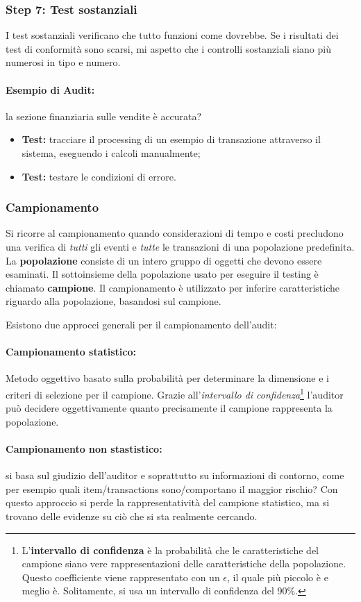 \subsubsection{Step 7: Test sostanziali}
I test sostanziali verificano che tutto funzioni come dovrebbe.
Se i risultati dei test di conformità sono scarsi, mi aspetto che i controlli
sostanziali siano più numerosi in tipo e numero.

\paragraph*{Esempio di Audit:} la sezione finanziaria sulle vendite è accurata?

\begin{itemize}
\item \textbf{Test:} tracciare il processing di un esempio di transazione
attraverso il sistema, eseguendo i calcoli manualmente;
\item \textbf{Test:} testare le condizioni di errore.
\end{itemize}


\subsubsection{Campionamento}
Si ricorre al campionamento quando considerazioni di tempo e costi
precludono una verifica di \emph{tutti} gli eventi e
\emph{tutte} le transazioni di una popolazione predefinita.
La \textbf{popolazione} consiste di un intero gruppo di oggetti
che devono essere esaminati.
Il sottoinsieme della popolazione usato per
eseguire il testing è chiamato \textbf{campione}. Il campionamento
è utilizzato per inferire caratteristiche riguardo alla popolazione,
basandosi sul campione.

Esistono due approcci generali per il campionamento dell'audit:
\paragraph*{Campionamento statistico:}
Metodo oggettivo basato sulla probabilità per determinare
la dimensione e i criteri di selezione per il campione.
Grazie all'\textit{intervallo
di confidenza}\footnote{L'\textbf{intervallo
di confidenza} è la probabilità che le caratteristiche del
campione siano vere rappresentazioni delle caratteristiche della
popolazione. Questo coefficiente viene rappresentato con un $\epsilon$,
il quale più piccolo è e meglio è. Solitamente, si usa un intervallo di
confidenza del 90\%.} l'auditor può decidere oggettivamente
quanto precisamente il campione rappresenta la popolazione.


\paragraph*{Campionamento non stastistico:} si basa sul giudizio
dell'auditor e soprattutto su informazioni di contorno, come per
esempio quali item/transactions sono/comportano il maggior rischio?
Con questo approccio si perde la rappresentatività
del campione statistico, ma si trovano delle evidenze su ciò che
si sta realmente cercando.
